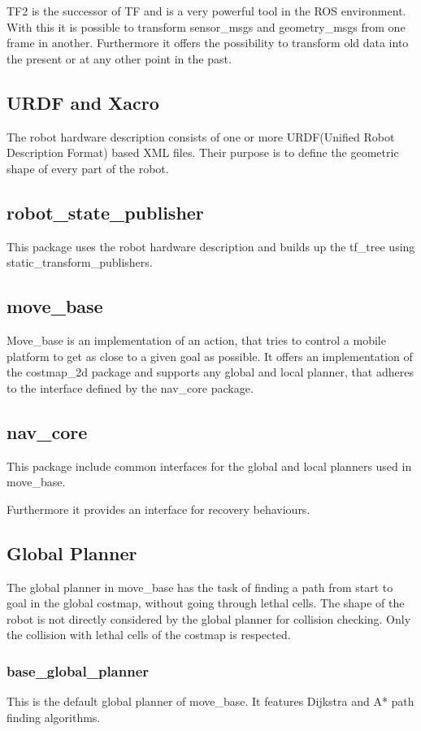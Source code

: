 TF2 is the successor of TF and is a very powerful tool in the ROS environment. With this it is possible to transform sensor\_msgs and geometry\_msgs from one frame in another. Furthermore it offers the possibility to transform old data into the present or at any other point in the past.

\subsection{URDF and Xacro}
The robot hardware description consists of one or more URDF(Unified Robot Description Format) based XML files. Their purpose is to define the geometric shape of every part of the robot. 

\subsection{robot\_state\_publisher}
	This package uses the robot hardware description and builds up the tf\_tree using static\_transform\_publishers.


\subsection{move\_base}
Move\_base is an implementation of an action, that tries to control a mobile platform to get as close to a given goal as possible. It offers an implementation of the costmap\_2d package and supports any global and local planner, that adheres to the interface defined by the nav\_core package\cite{movebase}.

\subsection{nav\_core}
This package include common interfaces for the global and local planners used in move\_base.

Furthermore it provides an interface for recovery behaviours\cite{navcore}.

\subsection{Global Planner}
The global planner in move\_base has the task of finding a path from start to goal in the global costmap, without going through lethal cells. The shape of the robot is not directly considered by the global planner for collision checking. Only the collision with lethal cells of the costmap is respected.

\subsubsection{base\_global\_planner}
This is the default global planner of move\_base. It features Dijkstra and A* path finding algorithms.\\

